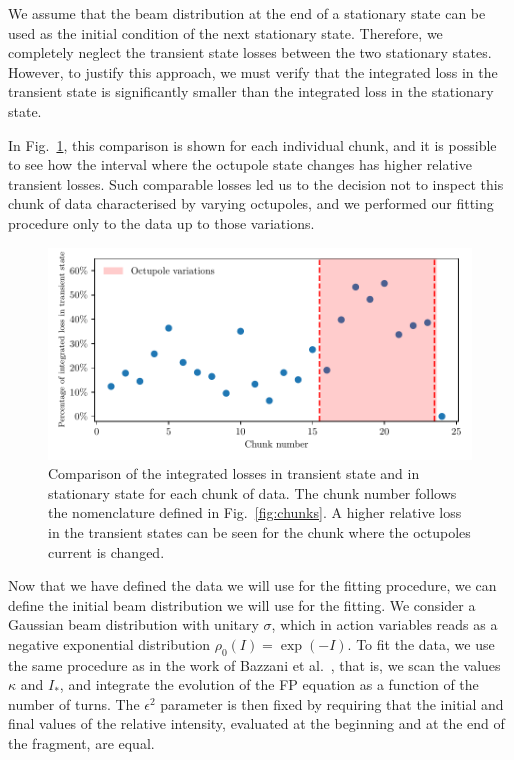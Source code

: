 We assume that the beam distribution at the end of a stationary state can be used as the initial condition of the next stationary state. Therefore, we completely neglect the transient state losses between the two stationary states. However, to justify this approach, we must verify that the integrated loss in the transient state is significantly smaller than the integrated loss in the stationary state.

In Fig.~\ref{fig:wire_loss_comp}, this comparison is shown for each individual chunk, and it is possible to see how the interval where the octupole state changes has higher relative transient losses. Such comparable losses led us to the decision not to inspect this chunk of data characterised by varying octupoles, and we performed our fitting procedure only to the data up to those variations.

\begin{figure}[hpt]
    \centering
    \includegraphics[width=1.0\textwidth]{5_wire_compensators_LHC/figs/losses_comparison.pdf}
    \caption{Comparison of the integrated losses in transient state and in stationary state for each chunk of data. The chunk number follows the nomenclature defined in Fig.~\ref{fig:chunks}. A higher relative loss in the transient states can be seen for the chunk where the octupoles current is changed.}
    \label{fig:wire_loss_comp}
\end{figure}

Now that we have defined the data we will use for the fitting procedure, we can define the initial beam distribution we will use for the fitting. We consider a Gaussian beam distribution with unitary $\sigma$, which in action variables reads as a negative exponential distribution $\rho_0(I) = \exp(-I)$. To fit the data, we use the same procedure as in the work of Bazzani et al.~\cite{bazzani2020diffusion}, that is, we scan the values $\kappa$ and $I_\ast$, and integrate the evolution of the FP equation as a function of the number of turns. The $\epsilon^2$ parameter is then fixed by requiring that the initial and final values of the relative intensity, evaluated at the beginning and at the end of the fragment, are equal.

